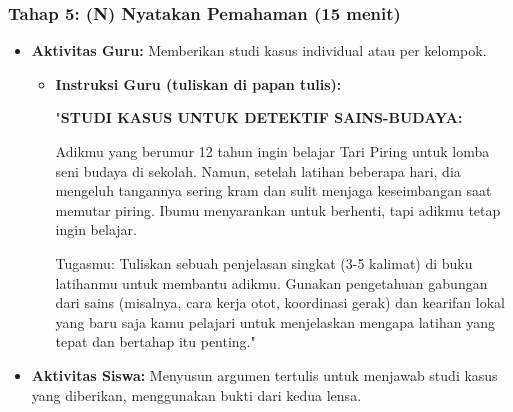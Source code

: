 \documentclass[a4paper,12pt]{article}
\begin{document}
\subsubsection{Tahap 5: (N) Nyatakan Pemahaman (15 menit)}
\begin{itemize}
\item \textbf{Aktivitas Guru:} Memberikan studi kasus individual atau per kelompok.
    \begin{itemize}
    \item \textbf{Instruksi Guru (tuliskan di papan tulis):}
    
    "\textbf{STUDI KASUS UNTUK DETEKTIF SAINS-BUDAYA:}
    
    Adikmu yang berumur 12 tahun ingin belajar Tari Piring untuk lomba seni budaya di sekolah. Namun, setelah latihan beberapa hari, dia mengeluh tangannya sering kram dan sulit menjaga keseimbangan saat memutar piring. Ibumu menyarankan untuk berhenti, tapi adikmu tetap ingin belajar.
    
    Tugasmu: Tuliskan sebuah penjelasan singkat (3-5 kalimat) di buku latihanmu untuk membantu adikmu. Gunakan pengetahuan gabungan dari sains (misalnya, cara kerja otot, koordinasi gerak) dan kearifan lokal yang baru saja kamu pelajari untuk menjelaskan mengapa latihan yang tepat dan bertahap itu penting."
    \end{itemize}
\item \textbf{Aktivitas Siswa:} Menyusun argumen tertulis untuk menjawab studi kasus yang diberikan, menggunakan bukti dari kedua lensa.
\end{itemize}
\end{document}
